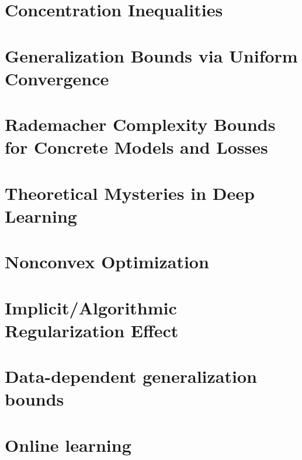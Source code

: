 \documentclass{book}
\theoremstyle{definition}
\theoremstyle{remark}
\numberwithin{section}{chapter}
\numberwithin{equation}{chapter}
\begin{document}
\chapter{Concentration Inequalities}\label{chap:conc}


\chapter{Generalization Bounds via Uniform Convergence}\label{chap:uc}




\chapter{Rademacher Complexity Bounds for Concrete Models and Losses}\label{chap:gen-bounds}



\chapter{Theoretical Mysteries in Deep Learning}


\chapter{Nonconvex Optimization}




\chapter{Implicit/Algorithmic Regularization Effect}




\chapter{Data-dependent generalization bounds}


\chapter{Online learning}




\appendix


\backmatter


\end{document}
